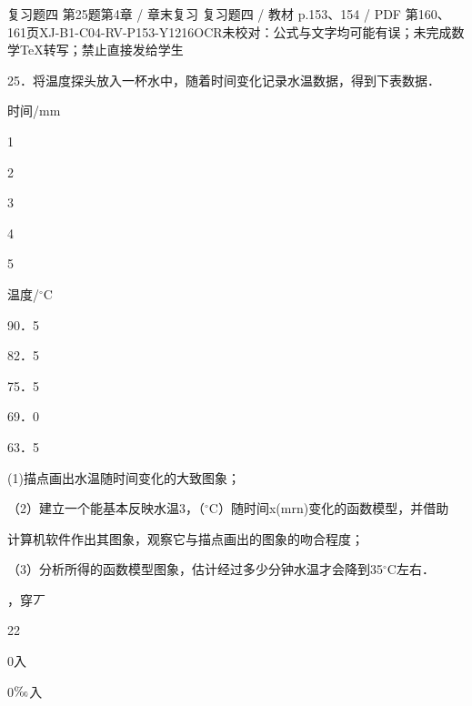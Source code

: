 \begin{bankitem}{复习题四 第25题}{第4章 / 章末复习 复习题四 / 教材 p.153、154 / PDF 第160、161页}{XJ-B1-C04-RV-P153-Y1216}{OCR未校对：公式与文字均可能有误；未完成数学TeX转写；禁止直接发给学生}
\begin{ocrdraft}
\par
25．将温度探头放入一杯水中，随着时间变化记录水温数据，得到下表数据．
\par
时间/mm
\par
1
\par
2
\par
3
\par
4
\par
5
\par
温度/\ensuremath{{}^\circ\mathrm C}
\par
90．5
\par
82．5
\par
75．5
\par
69．0
\par
63．5
\par
(1)描点画出水温随时间变化的大致图象；
\par
（2）建立一个能基本反映水温3，（\ensuremath{{}^\circ\mathrm C}）随时间x(mrn)变化的函数模型，并借助
\par
计算机软件作出其图象，观察它与描点画出的图象的吻合程度；
\par
（3）分析所得的函数模型图象，估计经过多少分钟水温才会降到35\ensuremath{{}^\circ\mathrm C}左右．
\par
[教材p.154 / PDF第161页]
\par
，穿丆
\par
22
\par
0入
\par
0\ensuremath{\text{\textperthousand}}入
\end{ocrdraft}
\end{bankitem}
